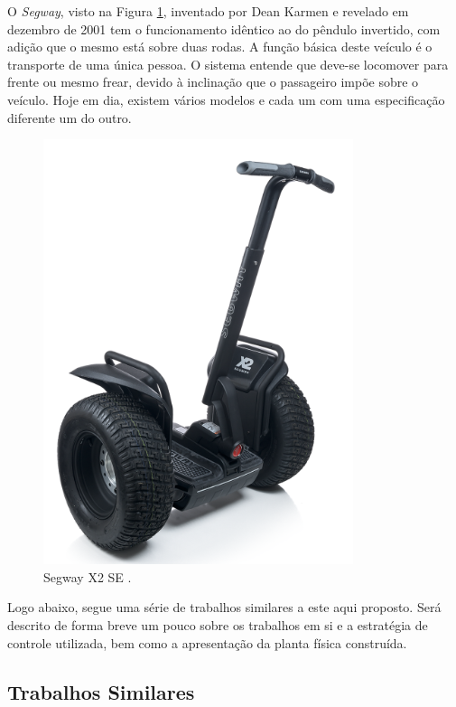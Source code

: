 O \textit{Segway}, visto na Figura \ref{fig:revisao_segway}, inventado por Dean Karmen e revelado em dezembro de 2001 tem o funcionamento idêntico ao do pêndulo invertido, com adição que o mesmo está sobre duas rodas. A função básica deste veículo é o transporte de uma única pessoa. O sistema entende que deve-se locomover para frente ou mesmo frear, devido à inclinação que o passageiro impõe sobre o veículo. Hoje em dia, existem vários modelos e cada um com uma especificação diferente um do outro.
\begin{figure}[H]
    \centering
    \includegraphics[scale=0.5]{Fundamentos/Segway}
    \caption{Segway X2 SE
    \citep{Segway}.}
    \label{fig:revisao_segway}
\end{figure}

Logo abaixo, segue uma série de trabalhos similares a este aqui proposto. Será descrito de forma breve um pouco sobre os trabalhos em si e a estratégia de controle utilizada, bem como a apresentação da planta física construída.

\subsection{Trabalhos Similares}

